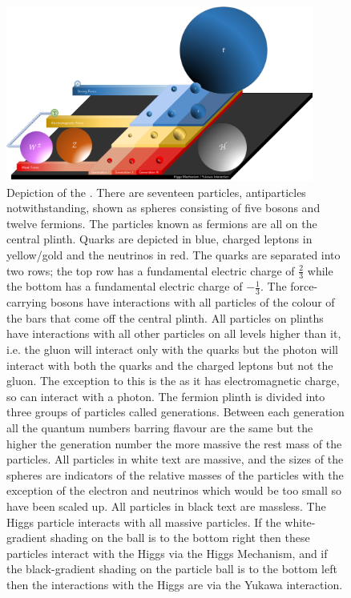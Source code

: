 \begin{figure}
	\centering
	\includegraphics[width=0.90\textwidth]{Introduction/SM.pdf}
	\caption[Depiction of the \SM showing its seventeen particles (five bosons and twelve fermions), as spheres on plinths that represent the fundamental forces.]{\footnotesize{Depiction of the \sm. There are seventeen particles, antiparticles notwithstanding, shown as spheres consisting of five bosons and twelve fermions. The particles known as fermions are all on the central plinth. Quarks are depicted in blue, charged leptons in yellow/gold and the neutrinos in red. The quarks are separated into two rows; the top row has a fundamental electric charge of $\frac{2}{3}$ while the bottom has a fundamental electric charge of $-\frac{1}{3}$. The force-carrying bosons have interactions with all particles of the colour of the bars that come off the central plinth. All particles on plinths have interactions with all other particles on all levels higher than it, i.e. the gluon will interact only with the quarks but the photon will interact with both the quarks and the charged leptons but not the gluon. The exception to this is the \W as it has electromagnetic charge, so can interact with a photon. The fermion plinth is divided into three groups of particles called generations. Between each generation all the quantum numbers barring flavour are the same but the higher the generation number the more massive the rest mass of the particles. All particles in white text are massive, and the sizes of the spheres are indicators of the relative masses of the particles with the exception of the electron and neutrinos which would be too small so have been scaled up. All particles in black text are massless. The Higgs particle interacts with all massive particles. If the white-gradient shading on the ball is to the bottom right then these particles interact with the Higgs via the Higgs Mechanism, and if the black-gradient shading on the particle ball is to the bottom left then the interactions with the Higgs are via the Yukawa interaction.}}
	\label{fig:SM} 
\end{figure}

